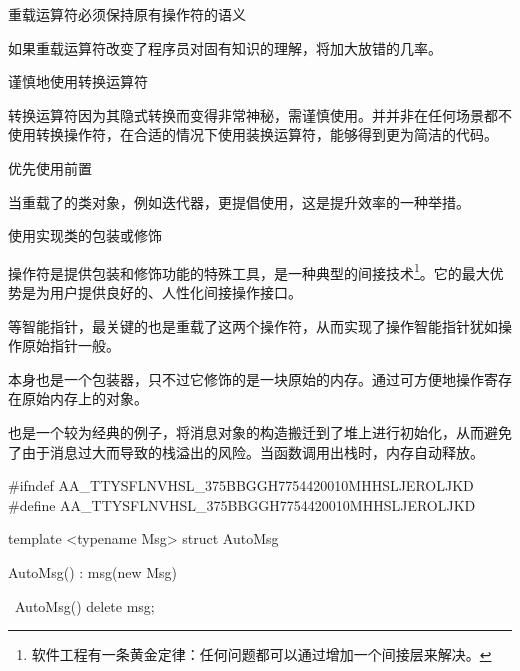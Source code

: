 \begin{content}

\begin{regulation}
重载运算符必须保持原有操作符的语义
\end{regulation}

如果重载运算符改变了程序员对固有知识的理解，将加大放错的几率。

\begin{regulation}
谨慎地使用转换运算符
\end{regulation}

转换运算符因为其隐式转换而变得非常神秘，需谨慎使用。并并非在任何场景都不使用转换操作符，在合适的情况下使用装换运算符，能够得到更为简洁的代码。

\begin{regulation}
优先使用前置
\end{regulation}

当重载了的类对象，例如迭代器，更提倡使用，这是提升效率的一种举措。

\begin{regulation}
使用实现类的包装或修饰
\end{regulation}

操作符是提供包装和修饰功能的特殊工具，是一种典型的间接技术\footnote{软件工程有一条黄金定律：任何问题都可以通过增加一个间接层来解决。}。它的最大优势是为用户提供良好的、人性化间接操作接口。

等智能指针，最关键的也是重载了这两个操作符，从而实现了操作智能指针犹如操作原始指针一般。

本身也是一个包装器，只不过它修饰的是一块原始的内存。通过可方便地操作寄存在原始内存上的对象。

也是一个较为经典的例子，将消息对象的构造搬迁到了堆上进行初始化，从而避免了由于消息过大而导致的栈溢出的风险。当函数调用出栈时，内存自动释放。

\begin{leftbar}
\begin{c++}[caption={base/AutoMsg.h}]
#ifndef AA_TTYSFLNVHSL_375BBGGH7754420010MHHSLJEROLJKD
#define AA_TTYSFLNVHSL_375BBGGH7754420010MHHSLJEROLJKD

template <typename Msg>
struct AutoMsg
{
    AutoMsg() : msg(new Msg)
    {}
    
    ~AutoMsg()
    {
        delete msg;
    }
    
}
\end{c++}
\end{leftbar}
\end{content}
